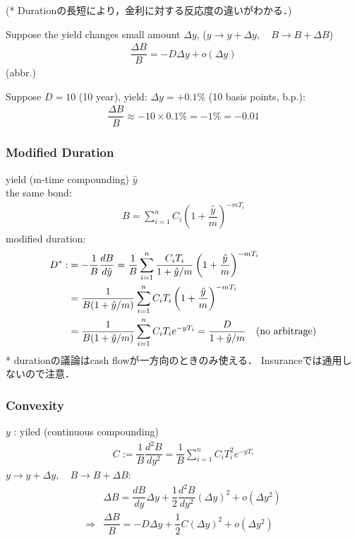 \documentclass[a4paper,11pt]{jsarticle}
\theoremstyle{definition}
\newcommand{\df}[2]{\dfrac{#1}{#2}}
\begin{document}
(* Durationの長短により，金利に対する反応度の違いがわかる．)

Suppose the yield changes small amount $\Delta y$, 
($y\to y+\Delta y, \quad B\to B+\Delta B$) \\
\begin{align}
  \df{\Delta B}{B}=-D\Delta y + o(\Delta y)
\end{align}
(abbr.)

Suppose $D=10$ (10 year),
yield: $\Delta y=+0.1\%$ (10 basis points, b.p.):
\begin{align}
  \df{\Delta B}{B} \approx -10 \times 0.1\% =-1\%=-0.01
\end{align}


\subsubsection{Modified Duration}
yield (m-time compounding) $\hat{y}$ \\
the same bond: 
\begin{align}
  B=\sum_{i=1}^{n}C_i \left(1+\df{\hat{y}}{m}\right)^{-mT_i}  
\end{align}
modified duration:
\begin{align}
  D^{*}:&=-\df{1}{B} \df{dB}{d\hat{y}}
  =\df{1}{B}\sum_{i=1}^{n}\df{C_i T_i}{1+\hat{y}/m}
  \left(1+\df{\hat{y}}{m}\right)^{-mT_i} \notag\\
  &=\df{1}{B(1+\hat{y}/m)}\sum_{i=1}^{n}C_i T_i
  \left(1+\df{\hat{y}}{m}\right)^{-mT_i} \notag\\
  &=\df{1}{B(1+\hat{y}/m)}\sum_{i=1}^{n}C_i T_i e^{-yT_i}
  =\df{D}{1+\hat{y}/m} \quad (\mbox{no arbitrage})
\end{align}
* durationの議論はcash flowが一方向のときのみ使える．
Insuranceでは通用しないので注意．


\subsubsection{Convexity}
$y$ : yiled (continuous compounding)
\begin{align}
  C:=\df{1}{B}\df{d^2B}{dy^2}
  =\df{1}{B}\sum_{i=1}^{n}C_i T_i^2 e^{-yT_i}
\end{align}
$y\to y+\Delta y, \quad B\to B+\Delta B$:
\begin{align}
  &\Delta B=\df{dB}{dy}\Delta y
  +\df{1}{2}\df{d^2B}{dy^2}(\Delta y)^2+o(\Delta y^2) \\
  \Rightarrow&\df{\Delta B}{B}=-D\Delta y
  +\df{1}{2}C(\Delta y)^2+o(\Delta y^2) 
\end{align}
\end{document}
